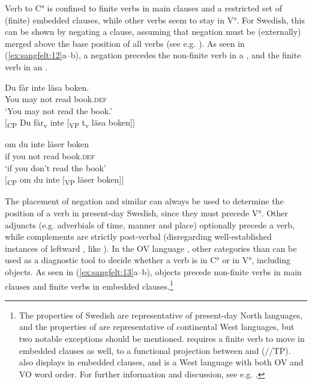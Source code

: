 \documentclass[output=paper, colorlinks, citecolor=brown]{langscibook}
\begin{document}
Verb  to C° is confined to finite verbs in main clauses and a restricted set of (finite) embedded clauses, while other verbs seem to stay in V°. For Swedish, this can be shown by negating a clause, assuming that negation must be (externally) merged above the base position of all verbs (see e.g. \citealt{Zeijlstra2013}). As seen in (\ref{ex:sangfelt:12}a–b), a negation precedes the non-finite verb in a , and the finite verb in an .


\ea {}\label{ex:sangfelt:12}
\begin{multicols}{2}\raggedcolumns
\ea \label{ex:sangfelt:12a}
\gll Du får inte läsa boken. \\
 You may not read book.\textsc{def}\\
\glt ‘You may not read the book.’\\

[\textsubscript{CP} Du får\textsubscript{v} inte [\textsubscript{VP} t\textsubscript{v} läsa boken]]\columnbreak

\ex\label{ex:sangfelt:12b}
\gll om du inte läser boken \\ 
 if you not read book.\textsc{def}\\
\glt ‘if you don’t read the book’\\

[\textsubscript{CP} om du inte [\textsubscript{VP} läser boken]]
\z 
\end{multicols}
\z 

The placement of negation and similar  can always be used to determine the position of a verb in present-day Swedish, since they must precede V°. Other adjuncts (e.g. adverbials of time, manner and place) optionally precede a verb, while complements are strictly post-verbal (disregarding well-established instances of leftward , like ). In the OV language , other categories than  can be used as a diagnostic tool to decide whether a verb is in C° or in V°, including objects. As seen in (\ref{ex:sangfelt:13}a–b), objects precede non-finite verbs in main clauses and finite verbs in embedded clauses.\footnote{The properties of Swedish are representative of present-day North  languages, and the properties of  are representative of continental West  languages, but two notable exceptions should be mentioned.  requires a finite verb to move in embedded clauses as well, to a functional projection between  and  (//TP).  also displays  in embedded clauses, and is a West  language with both OV and VO word order. For further information and discussion, see e.g. \citet[3–18]{Vikner2001}.}
\end{document}
